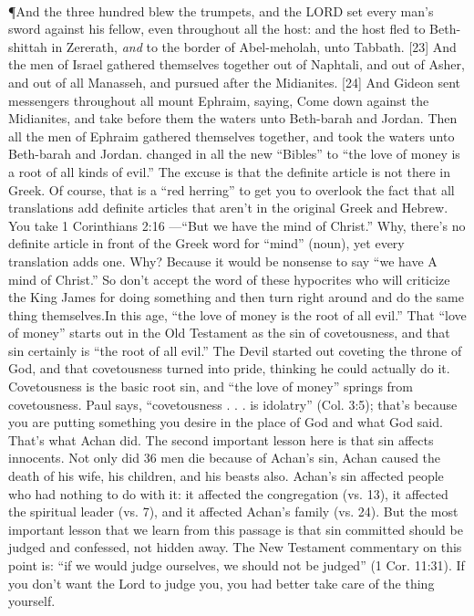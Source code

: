 {\\
\P \textcolor[rgb]{0.00,0.00,1.00}{And the three hundred blew the trumpets, and the LORD set every man's sword against his fellow, even throughout all the host: and the host fled to Beth-shittah in Zererath, \emph{and} to the border of Abel-meholah, unto Tabbath.}
[23] \textcolor[rgb]{0.00,0.00,1.00}{And the men of Israel gathered themselves together out of Naphtali, and out of Asher, and out of all Manasseh, and pursued after the Midianites.}
[24] \textcolor[rgb]{0.00,0.00,1.00}{And Gideon sent messengers throughout all mount Ephraim, saying, Come down against the Midianites, and take before them the waters unto Beth-barah and Jordan. Then all the men of Ephraim gathered themselves together, and took the waters unto Beth-barah and Jordan.}%
changed in all the new “Bibles” to “the love of money is a root of all kinds of evil.” The
excuse is that the definite article is not there in
Greek. Of course, that is a “red herring” to get
you to overlook the fact that all translations add
definite articles that aren’t in the original Greek
and Hebrew. You take 1 Corinthians 2:16
—“But we have the mind of Christ.” Why,
there’s no definite article in front of the Greek
word for “mind” (noun), yet every translation
adds one. Why? Because it would be nonsense
to say “we have A mind of Christ.” So don’t
accept the word of these hypocrites who will
criticize the King James for doing something
and then turn right around and do the same
thing themselves.In this age, “the love of money is the root
of all evil.” That “love of money” starts out in
the Old Testament as the sin of covetousness,
and that sin certainly is “the root of all evil.”
The Devil started out coveting the throne of
God, and that covetousness turned into pride,
thinking he could actually do it. Covetousness is
the basic root sin, and “the love of money”
springs from covetousness. Paul says,
“covetousness . . . is idolatry” (Col. 3:5);
that’s because you are putting something you
desire in the place of God and what God said.
That’s what Achan did.
The second important lesson here is that sin
affects innocents. Not only did 36 men die because of Achan’s sin, Achan caused the death of his wife, his children, and his beasts also. Achan’s sin affected people who had nothing to do with it: it affected the congregation (vs. 13), it affected the spiritual leader (vs. 7), and it affected Achan’s family (vs. 24). But the most important lesson that we learn from this passage is that sin committed should be judged and confessed, not hidden away. The New Testament commentary on this point is: “if we would judge ourselves, we should not be judged” (1 Cor. 11:31). If you don’t want the Lord to judge you, you had better take care of the thing yourself.}
